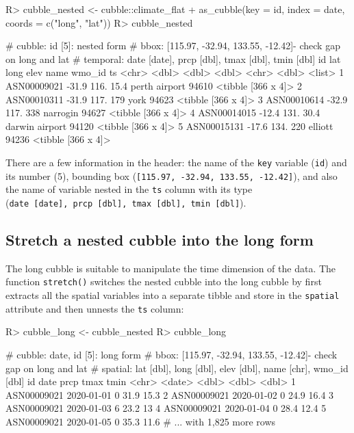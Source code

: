 \documentclass[
]{jss}
\begin{document}
\begin{CodeChunk}
\begin{CodeInput}
R> cubble_nested <- cubble::climate_flat %
+   as_cubble(key = id, index = date, coords = c("long", "lat"))
R> cubble_nested
\end{CodeInput}
\begin{CodeOutput}
# cubble:   id [5]: nested form
# bbox:     [115.97, -32.94, 133.55, -12.42]- check gap on long and lat
# temporal: date [date], prcp [dbl], tmax [dbl], tmin [dbl]
  id            lat  long  elev name           wmo_id ts                
  <chr>       <dbl> <dbl> <dbl> <chr>           <dbl> <list>            
1 ASN00009021 -31.9  116.  15.4 perth airport   94610 <tibble [366 x 4]>
2 ASN00010311 -31.9  117. 179   york            94623 <tibble [366 x 4]>
3 ASN00010614 -32.9  117. 338   narrogin        94627 <tibble [366 x 4]>
4 ASN00014015 -12.4  131.  30.4 darwin airport  94120 <tibble [366 x 4]>
5 ASN00015131 -17.6  134. 220   elliott         94236 <tibble [366 x 4]>
\end{CodeOutput}
\end{CodeChunk}

There are a few information in the  header: the name of the
\texttt{key} variable (\texttt{id}) and its number (5), bounding box
(\texttt{{[}115.97,\ -32.94,\ 133.55,\ -12.42{]}}), and also the name of
variable nested in the \texttt{ts} column with its type
(\texttt{date\ {[}date{]},\ prcp\ {[}dbl{]},\ tmax\ {[}dbl{]},\ tmin\ {[}dbl{]}}).

\hypertarget{stretch-a-nested-cubble-into-the-long-form}{%
\subsection{Stretch a nested cubble into the long
form}\label{stretch-a-nested-cubble-into-the-long-form}}

The long cubble is suitable to manipulate the time dimension of the
data. The function \texttt{stretch()} switches the nested cubble into
the long cubble by first extracts all the spatial variables into a
separate tibble and store in the \texttt{spatial} attribute and then
unnests the \texttt{ts} column:

\begin{CodeChunk}
\begin{CodeInput}
R> cubble_long <- cubble_nested %
R> cubble_long
\end{CodeInput}
\begin{CodeOutput}
# cubble:  date, id [5]: long form
# bbox:    [115.97, -32.94, 133.55, -12.42]- check gap on long and lat
# spatial: lat [dbl], long [dbl], elev [dbl], name [chr], wmo_id [dbl]
  id          date        prcp  tmax  tmin
  <chr>       <date>     <dbl> <dbl> <dbl>
1 ASN00009021 2020-01-01     0  31.9  15.3
2 ASN00009021 2020-01-02     0  24.9  16.4
3 ASN00009021 2020-01-03     6  23.2  13  
4 ASN00009021 2020-01-04     0  28.4  12.4
5 ASN00009021 2020-01-05     0  35.3  11.6
# ... with 1,825 more rows
\end{CodeOutput}
\end{CodeChunk}
\end{document}
